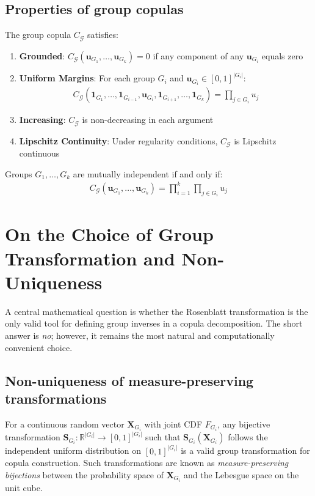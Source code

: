 \subsection{Properties of group copulas}
\begin{proposition}
\label{prop:group_copula_properties}
The group copula $C_{\mathcal{G}}$ satisfies:
\begin{enumerate}
    \item \textbf{Grounded}: $C_{\mathcal{G}}(\mathbf{u}_{G_1}, \ldots, \mathbf{u}_{G_k}) = 0$ if any component of any $\mathbf{u}_{G_i}$ equals zero
    \item \textbf{Uniform Margins}: For each group $G_i$ and $\mathbf{u}_{G_i} \in [0,1]^{|G_i|}$:
    \begin{align}
    C_{\mathcal{G}}(\mathbf{1}_{G_1}, \ldots, \mathbf{1}_{G_{i-1}}, \mathbf{u}_{G_i}, \mathbf{1}_{G_{i+1}}, \ldots, \mathbf{1}_{G_k}) = \prod_{j \in G_i} u_j
    \end{align}
    \item \textbf{Increasing}: $C_{\mathcal{G}}$ is non-decreasing in each argument
    \item \textbf{Lipschitz Continuity}: Under regularity conditions, $C_{\mathcal{G}}$ is Lipschitz continuous
\end{enumerate}
\end{proposition}

\begin{proposition}
Groups $G_1, \ldots, G_k$ are mutually independent if and only if:
\begin{align}
C_{\mathcal{G}}(\mathbf{u}_{G_1}, \ldots, \mathbf{u}_{G_k}) = \prod_{i=1}^k \prod_{j \in G_i} u_j
\end{align}
\end{proposition}

\section{On the Choice of Group Transformation and Non-Uniqueness}
\label{sec:choice_of_transform}

A central mathematical question is whether the Rosenblatt transformation is the only valid tool for defining group inverses in a copula decomposition. The short answer is \emph{no}; however, it remains the most natural and computationally convenient choice.

\subsection{Non-uniqueness of measure-preserving transformations}
For a continuous random vector $\mathbf{X}_{G_i}$ with joint CDF $F_{G_i}$, any bijective transformation $\mathbf{S}_{G_i}: \mathbb{R}^{|G_i|} \to [0,1]^{|G_i|}$ such that $\mathbf{S}_{G_i}(\mathbf{X}_{G_i})$ follows the independent uniform distribution on $[0,1]^{|G_i|}$ is a valid group transformation for copula construction. Such transformations are known as \emph{measure-preserving bijections} between the probability space of $\mathbf{X}_{G_i}$ and the Lebesgue space on the unit cube.

